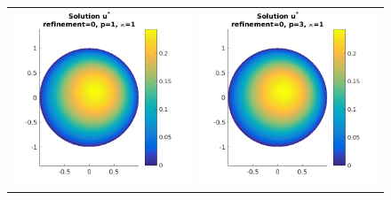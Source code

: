 \documentclass{article}
\begin{document}
\begin{figure}[!ht]
\centering
\begin{tabular}{c c}
\includegraphics[scale=0.7]{umustar_111.png} &
\includegraphics[scale=0.7]{umustar_211.png} \\

\end{tabular}
\end{figure}
\end{document}
